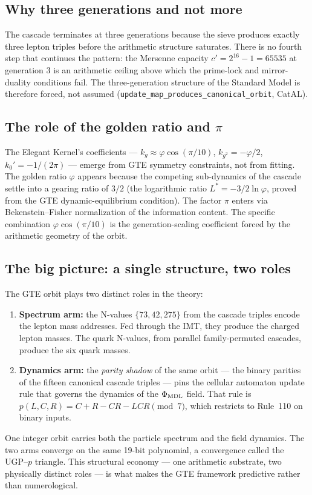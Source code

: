 \documentclass[11pt,a4paper]{article}
\newcommand{\lean}[1]{\texttt{#1}}
\newcommand{\CatAL}{\textsf{CatAL}}
\begin{document}
\subsection{Why three generations and not more}

The cascade terminates at three generations because the sieve produces exactly three
lepton triples before the arithmetic structure saturates.  There is no fourth step
that continues the pattern: the Mersenne capacity $c' = 2^{16} - 1 = 65535$ at
generation 3 is an arithmetic ceiling above which the prime-lock and mirror-duality
conditions fail.  The three-generation structure of the Standard Model is therefore
forced, not assumed
(\lean{update\_map\_produces\_canonical\_orbit}, \CatAL).

\subsection{The role of the golden ratio and $\pi$}

The Elegant Kernel's coefficients --- $k_g \approx \varphi\cos(\pi/10)$,
$k_{g^2} = -\varphi/2$, $k_0' = -1/(2\pi)$ --- emerge from GTE symmetry constraints,
not from fitting.  The golden ratio $\varphi$ appears because the competing
sub-dynamics of the cascade settle into a gearing ratio of $3/2$ (the logarithmic
ratio $L^* = -3/2\ln\varphi$, proved from the GTE dynamic-equilibrium condition).
The factor $\pi$ enters via Bekenstein--Fisher normalization of the information
content.  The specific combination $\varphi\cos(\pi/10)$ is the generation-scaling
coefficient forced by the arithmetic geometry of the orbit.

\subsection{The big picture: a single structure, two roles}

The GTE orbit plays two distinct roles in the theory:
\begin{enumerate}[itemsep=3pt]
  \item \textbf{Spectrum arm:} the N-values $\{73, 42, 275\}$ from the cascade
    triples encode the lepton mass addresses.  Fed through the IMT, they produce the
    charged lepton masses.  The quark N-values, from parallel family-permuted cascades,
    produce the six quark masses.
  \item \textbf{Dynamics arm:} the \emph{parity shadow} of the same orbit --- the
    binary parities of the fifteen canonical cascade triples --- pins the cellular
    automaton update rule that governs the dynamics of the $\Phi_{\rm MDL}$ field.
    That rule is $p(L,C,R) = C + R - CR - LCR \pmod{7}$, which restricts to
    Rule~110 on binary inputs.
\end{enumerate}
One integer orbit carries both the particle spectrum and the field dynamics.  The two
arms converge on the same 19-bit polynomial, a convergence called the UGP--$p$
triangle.  This structural economy --- one arithmetic substrate, two physically
distinct roles --- is what makes the GTE framework predictive rather than numerological.
\end{document}
